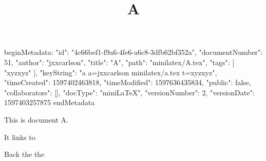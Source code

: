 beginMetadata:
{
    "id": "4c66bef1-f9a6-4fe6-a6c8-3dfb62bf352a",
    "documentNumber": 51,
    "author": "jxxcarlson",
    "title": "A",
    "path": "minilatex/A.tex",
    "tags": [
        "xyzxyz"
    ],
    "keyString": "a a=jxxcarlson minilatex/a.tex t=xyzxyz",
    "timeCreated": 1597402463818,
    "timeModified": 1597636435834,
    "public": false,
    "collaborators": [],
    "docType": "miniLaTeX",
    "versionNumber": 2,
    "versionDate": 1597403257875
}
endMetadata
\title{A}

\maketitle

This is document A.

It links to 

Back the the 

